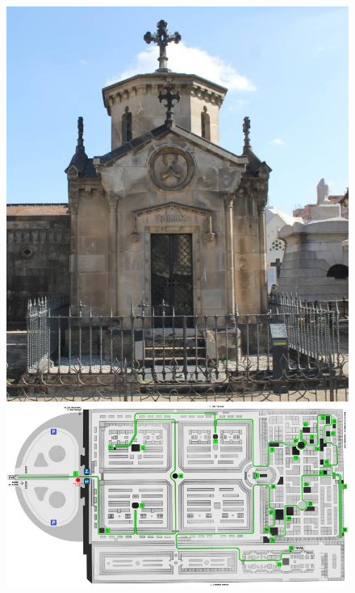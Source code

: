 \documentclass[10pt,twocolumn,letterpaper]{article}
\begin{document}
\begin{figure}[!htb]
    \centering
    \begin{minipage}[t]{0.23\textwidth}
        \includegraphics[width=\textwidth]{img/4440bfd817bfb6c8.jpg}
    \end{minipage}
    \begin{minipage}[t]{0.23\textwidth}
        \includegraphics[width=\textwidth]{img/1115e27655e0f398.jpg}
    \end{minipage}


\end{figure}
\end{document}

